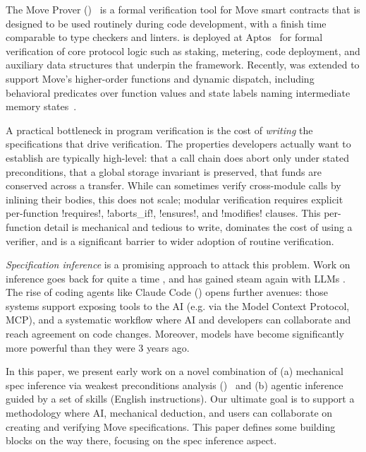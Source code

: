 \label{sec:intro}

The Move Prover (\MVP)~\cite{DillGPQXZ22} is a formal verification tool for Move smart contracts that is designed to be used routinely during code development, with a finish time comparable to type checkers and linters.
\MVP is deployed at Aptos~\cite{ParkZGXGCLC24} for formal verification of core protocol logic such as staking, metering, code deployment, and auxiliary data structures that underpin the framework.
Recently, \MVP was extended to support Move's higher-order functions and dynamic dispatch, including behavioral predicates over function values and state labels naming intermediate memory states~\cite{grieskamp2025movehigherorder}.

A practical bottleneck in program verification is the cost of \emph{writing} the specifications that drive verification.
The properties developers actually want to establish are typically high-level: that a call chain does abort only under stated preconditions, that a global storage invariant is preserved, that funds are conserved across a transfer.
While \MVP can sometimes verify cross-module calls by inlining their bodies, this does not scale; modular verification requires explicit per-function !requires!, !aborts_if!, !ensures!, and !modifies! clauses.
This per-function detail is mechanical and tedious to write, dominates the cost of using a verifier, and is a significant barrier to wider adoption of routine verification.

\emph{Specification inference} is a promising approach to attack this problem. Work on inference goes back for quite a time \cite{DaikonTSE01}, and has gained steam again with LLMs \cite{PeiEtAl23, KamathEtAl23}.
The rise of coding agents like Claude Code (\CC) opens further avenues: those systems support exposing tools to the AI (e.g. via the Model Context Protocol, MCP), and a systematic workflow where AI and developers can collaborate and reach agreement on code changes. Moreover, models have become significantly more powerful than they were 3 years ago.

In this paper, we present early work on a novel combination of (a) mechanical spec inference via weakest preconditions analysis (\WP)~\cite{dijkstra1975wp,BL05} and (b) agentic inference guided by a set of skills (English instructions).
Our ultimate goal is to support a methodology where AI, mechanical deduction, and users can collaborate on creating and verifying Move specifications.
This paper defines some building blocks on the way there, focusing on the spec inference aspect.

